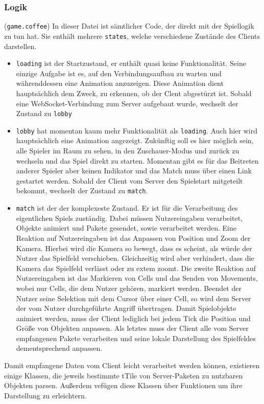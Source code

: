 \subsubsection{Logik} (\verb+game.coffee+)
In dieser Datei ist sämtlicher Code, der direkt mit der Spiellogik zu tun hat. Sie enthält mehrere \verb+states+, welche verschiedene Zustände des Clients darstellen.
\begin{itemize}
	\item \verb+loading+ ist der Startzustand, er enthält quasi keine Funktionalität. Seine einzige Aufgabe ist es, auf den Verbindungsaufbau zu warten und währenddessen eine Animation anzuzeigen. Diese Animation dient hauptsächlich dem Zweck, zu erkennen, ob der Clent abgestürzt ist. Sobald eine WebSocket-Verbindung zum Server aufgebaut wurde, wechselt der Zustand zu \verb+lobby+
	\item \verb+lobby+ hat momentan kaum mehr Funktionalität als \verb+loading+. Auch hier wird hauptsächlich eine Animation angezeigt. Zukünftig soll es hier möglich sein, alle Spieler im Raum zu sehen, in den Zuschauer-Modus und zurück zu wechseln und das Spiel direkt zu starten. Momentan gibt es für das Beitreten anderer Spieler aber keinen Indikator und das Match muss über einen Link gestartet werden. Sobald der Client vom Server den Spielstart mitgeteilt bekommt, wechselt der Zustand zu \verb+match+.
	\item \verb+match+ ist der der komplexeste Zustand. Er ist für die Verarbeitung des eigentlichen Spiels zuständig. Dabei müssen Nutzereingaben verarbeitet, Objekte animiert und Pakete gesendet, sowie verarbeitet werden.
	Eine Reaktion auf Nutzereingaben ist das Anpassen von Position und Zoom der Kamera. Hierbei wird die Kamera so bewegt, dass es scheint, als würde der Nutzer das Spielfeld verschieben. Gleichzeitig wird aber verhindert, dass die Kamera das Spielfeld verlässt oder zu extem zoomt.
	Die zweite Reaktion auf Nutzereingaben ist das Markieren von Cells und das Senden von Movements, wobei nur Cells, die dem Nutzer gehören, markiert werden. Beendet der Nutzer seine Selektion mit dem Cursor über einer Cell, so wird dem Server der vom Nutzer durchgeführte Angriff übertragen.
	Damit Spielobjekte animiert werden, muss der Client lediglich bei jedem Tick die Position und Größe von Objekten anpassen.
	Als letztes muss der Client alle vom Server empfangenen Pakete verarbeiten und seine lokale Darstellung des Spielfeldes dementsprechend anpassen.
\end{itemize}

Damit empfangene Daten vom Client leicht verarbeitet werden können, existieren einige Klassen, die jeweils bestimmte tTile von Server-Paketen zu nutzbaren Objekten parsen. Außerdem vefügen diese Klassen über Funktionen um ihre Darstellung zu erleichtern.

